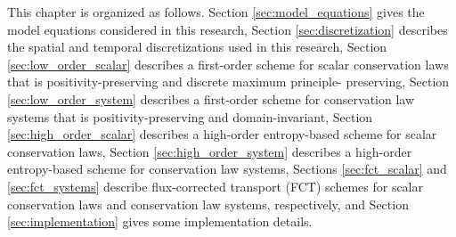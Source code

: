 This chapter is organized as follows. Section \ref{sec:model_equations} gives
the model equations considered in this research, Section \ref{sec:discretization}
describes the spatial and temporal discretizations used in this research,
Section \ref{sec:low_order_scalar} describes a first-order scheme for scalar
conservation laws that is positivity-preserving and discrete maximum principle-
preserving, Section \ref{sec:low_order_system} describes a first-order scheme
for conservation law systems that is positivity-preserving and domain-invariant,
Section \ref{sec:high_order_scalar} describes a high-order entropy-based
scheme for scalar conservation laws, Section \ref{sec:high_order_system}
describes a high-order entropy-based scheme for conservation law systems,
Sections \ref{sec:fct_scalar} and \ref{sec:fct_systems} describe flux-corrected
transport (FCT) schemes for scalar conservation laws and conservation law
systems, respectively, and Section \ref{sec:implementation} gives some implementation
details.


